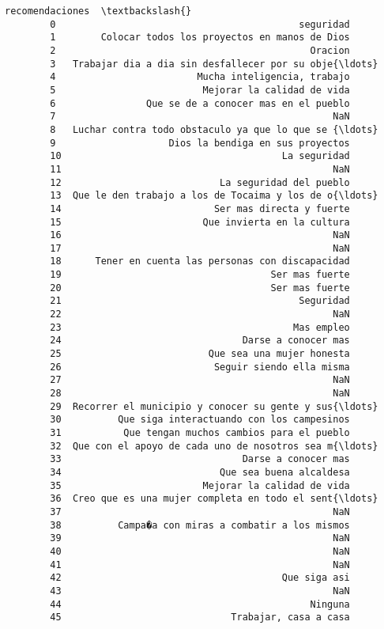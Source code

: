 \documentclass[11pt]{article}
\begin{document}
\begin{Verbatim}[commandchars=\\\{\}]
                                              recomendaciones  \textbackslash{}
        0                                           seguridad   
        1        Colocar todos los proyectos en manos de Dios   
        2                                             Oracion   
        3   Trabajar dia a dia sin desfallecer por su obje{\ldots}   
        4                         Mucha inteligencia, trabajo   
        5                          Mejorar la calidad de vida   
        6                Que se de a conocer mas en el pueblo   
        7                                                 NaN   
        8   Luchar contra todo obstaculo ya que lo que se {\ldots}   
        9                    Dios la bendiga en sus proyectos   
        10                                       La seguridad   
        11                                                NaN   
        12                            La seguridad del pueblo   
        13  Que le den trabajo a los de Tocaima y los de o{\ldots}   
        14                           Ser mas directa y fuerte   
        15                         Que invierta en la cultura   
        16                                                NaN   
        17                                                NaN   
        18      Tener en cuenta las personas con discapacidad   
        19                                     Ser mas fuerte   
        20                                     Ser mas fuerte   
        21                                          Seguridad   
        22                                                NaN   
        23                                         Mas empleo   
        24                                Darse a conocer mas   
        25                          Que sea una mujer honesta   
        26                           Seguir siendo ella misma   
        27                                                NaN   
        28                                                NaN   
        29  Recorrer el municipio y conocer su gente y sus{\ldots}   
        30          Que siga interactuando con los campesinos   
        31           Que tengan muchos cambios para el pueblo   
        32  Que con el apoyo de cada uno de nosotros sea m{\ldots}   
        33                                Darse a conocer mas   
        34                            Que sea buena alcaldesa   
        35                         Mejorar la calidad de vida   
        36  Creo que es una mujer completa en todo el sent{\ldots}   
        37                                                NaN   
        38          Campa�a con miras a combatir a los mismos   
        39                                                NaN   
        40                                                NaN   
        41                                                NaN   
        42                                       Que siga asi   
        43                                                NaN   
        44                                            Ninguna   
        45                              Trabajar, casa a casa   
        

\end{Verbatim}
\end{document}
